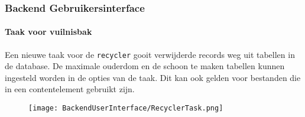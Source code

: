 \begin{frame}[fragile]
	\frametitle{Backend Gebruikersinterface}
	\framesubtitle{Taak voor vuilnisbak}

	Een nieuwe taak voor de \texttt{recycler} gooit verwijderde records weg uit tabellen
	in de database. De maximale ouderdom en de schoon te maken tabellen kunnen
	ingesteld worden in de opties van de taak.
	\newline
	Dit kan ook gelden voor bestanden die in een contentelement gebruikt zijn.

	\begin{figure}
		\texttt{[image: BackendUserInterface/RecyclerTask.png]}
	\end{figure}

\end{frame}

